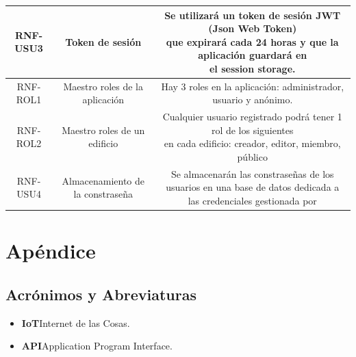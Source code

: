 \documentclass[12pt, a4paper, twoside]{article}
\newcommand\ttab{\tab \hspace{-5cm}}
\begin{document}
\begin{table}
\begin{tabular}{ |c|c|c| }
  RNF-USU3 & Token de sesión 
  & \makecell[l]{Se utilizará un token de sesión JWT (Json Web Token) \\
   que expirará cada 24 horas y que la aplicación guardará en \\
   el session storage.
   } \\ \hline
  RNF-ROL1 & Maestro roles de la aplicación 
  & Hay 3 roles en la aplicación: administrador, usuario y anónimo. \\ \hline
  RNF-ROL2 & Maestro roles de un edificio 
  & \makecell[l]{Cualquier usuario registrado podrá tener 1 rol de los siguientes \\
  en cada edificio:  creador, editor, miembro, público
  } \\ \hline

  RNF-USU4 & Almacenamiento de la constraseña & Se almacenarán las constraseñas de los 
  usuarios en una base de datos dedicada a las credenciales gestionada por 
  \end{tabular}
\end{table}
\section{Apéndice}
\subsection{Acrónimos y Abreviaturas}
\begin{itemize}
    \item \textbf{IoT}\ttab Internet de las Cosas.
    \item \textbf{API}\ttab Application Program Interface.
  \end{itemize}
\end{document}
